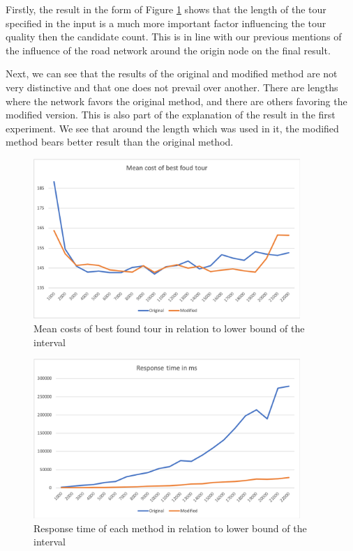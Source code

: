 \documentclass{ctuthesis}
\begin{document}
\par
Firstly, the result in the form of Figure \ref{fig:lengthBest} shows that the length of the tour specified in the input is a much more important factor influencing the tour quality then the candidate count. This is in line with our previous mentions of the influence of the road network around the origin node on the final result. \par 
Next, we can see that the results of the original and modified method are not very distinctive and that one does not prevail over another. There are lengths where the network favors the original method, and there are others favoring the modified version. This is also part of the explanation of the result in the first experiment. We see that around the length which was used in it, the modified method bears better result than the original method.
\par

\begin{figure}
	\includegraphics[width=0.9\textwidth]{lengthBest.png}
	\caption{Mean costs of best found tour in relation to lower bound of the interval}
	\label{fig:lengthBest}
\end{figure}

\begin{figure}
	\includegraphics[width=0.9\textwidth]{lengthTime.png}
	\caption{Response time of each method in relation to lower bound of the interval}
	\label{fig:lengthTime}
\end{figure}
 \par
\end{document}
